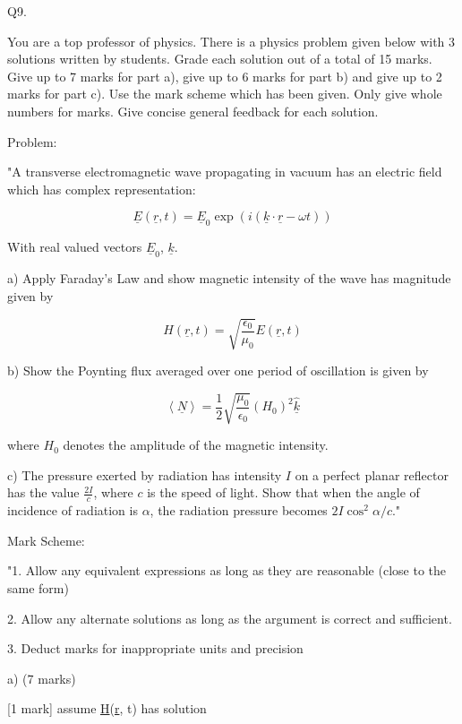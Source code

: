                            Q9. 

You are a top professor of physics. There is a physics problem given below with 3 solutions written by students. Grade each solution out of a total of 15 marks. Give up to 7 marks for part a), give up to 6 marks for part b) and give up to 2 marks for part c). Use the mark scheme which has been given. Only give whole numbers for marks. Give concise general feedback for each solution. 

Problem:

"A transverse electromagnetic wave propagating in vacuum has an electric field which has complex representation:

\[ \underline{E}(\underline{r}, t) = \underline{E}_{0} \exp (i(\underline{k} \cdot \underline{r} - \omega t)) \]

With real valued vectors \( \underline{E}_{0} \), \( \underline{k} \).

a) Apply Faraday’s Law and show magnetic intensity of the wave has magnitude given by 

\[ H(\underline{r}, t) = \sqrt{\frac{\epsilon_{0}}{\mu_{0}}} E(\underline{r}, t) \]

b) Show the Poynting flux averaged over one period of oscillation is given by 

\[ \left< \underline{N} \right> = \frac{1}{2} \sqrt{\frac{\mu_{0}}{\epsilon_{0}}} (H_{0})^{2} \hat{\underline{k}} \]

where \( H_{0} \) denotes the amplitude of the magnetic intensity.
    
c) The pressure exerted by radiation has intensity \( I \) on a perfect planar reflector has the value \( \frac{2I}{c} \), where \( c \) is the speed of light. Show that when the angle of incidence of radiation is \( \alpha \), the radiation pressure becomes \( 2I\cos^{2}{\alpha}/{c} \)."

Mark Scheme: 

"1. Allow any equivalent expressions as long as they are reasonable (close to the same form)

2. Allow any alternate solutions as long as the argument is correct and sufficient. 

3. Deduct marks for inappropriate units and precision

a) (7 marks)

[1 mark] assume \underline{H}(\underline{r}, t) has solution

